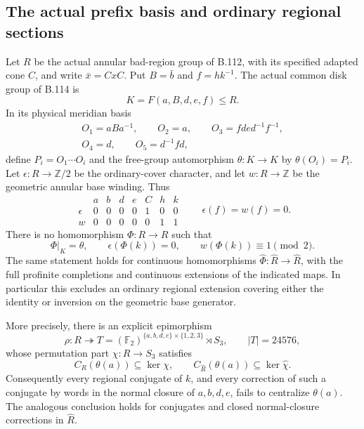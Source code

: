 \subsection*{The actual prefix basis and ordinary regional sections}

\label{stmt:B115}
Let $R$ be the actual annular bad-region group of B.112, with its
specified adapted cone $C$, and write $\bar x=CxC$. Put $B=\bar b$
and $f=hk^{-1}$. The actual common disk group of B.114 is
\[
 K=F(a,B,d,e,f)\leq R.
\]
In its physical meridian basis
\begin{equation}\label{eq:B115-physical-basis}
 \begin{gathered}
 O_1=aBa^{-1},\qquad O_2=a,\qquad
 O_3=fde d^{-1}f^{-1},\\
 O_4=d,\qquad O_5=d^{-1}fd,
 \end{gathered}
\end{equation}
define $P_i=O_1\cdots O_i$ and the free-group automorphism
$\theta:K\to K$ by $\theta(O_i)=P_i$.
Let $\epsilon:R\to\mathbb Z/2$ be the ordinary-cover character,
and let $w:R\to\mathbb Z$ be the geometric annular base winding.
Thus
\begin{equation}\label{eq:B115-characters}
 \begin{array}{c|rrrrrrr}
        &a&b&d&e&C&h&k\\ \hline
 \epsilon&0&0&0&0&1&0&0\\
 w       &0&0&0&0&0&1&1
 \end{array}
 \qquad \epsilon(f)=w(f)=0.
\end{equation}
There is no homomorphism $\Phi:R\to R$ such that
\begin{equation}\label{eq:B115-forbidden-extension}
 \Phi|_K=\theta,\qquad
 \epsilon(\Phi(k))=0,\qquad w(\Phi(k))\equiv1\pmod2.
\end{equation}
The same statement holds for continuous homomorphisms
$\widehat\Phi:\widehat R\to\widehat R$, with the full profinite
completions and continuous extensions of the indicated maps.
In particular this excludes an ordinary regional extension covering
either the identity or inversion on the geometric base generator.

More precisely, there is an explicit epimorphism
\[
 \rho:R\twoheadrightarrow
 T=(\mathbb F_2)^{\{a,b,d,e\}\times\{1,2,3\}}\rtimes S_3,
 \qquad |T|=24576,
\]
whose permutation part $\chi:R\to S_3$ satisfies
\begin{equation}\label{eq:B115-strong-conclusion}
 C_R(\theta(a))\subseteq\ker\chi,
 \qquad
 C_{\widehat R}(\theta(a))\subseteq\ker\widehat\chi.
\end{equation}
Consequently every regional conjugate of $k$, and every correction of
such a conjugate by words in the normal closure of $a,b,d,e$, fails to
centralize $\theta(a)$. The analogous conclusion holds for conjugates
and closed normal-closure corrections in $\widehat R$.


